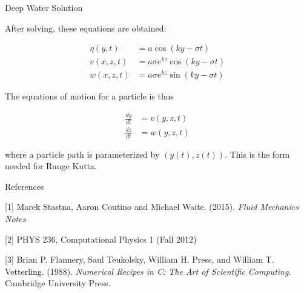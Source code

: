 \documentclass{beamer}
\begin{document}
\begin{frame}{Deep Water Solution}

After solving, these equations are obtained:

\begin{align*}
\eta (y,t) &= a \cos (ky-\sigma t) \\
v(x,z,t) &= a \sigma e^{kz} \cos (ky-\sigma t) \\
w(x,z,t) &= a \sigma e^{kz} \sin (ky-\sigma t)
\end{align*}

\vspace{0.03\textheight}

The equations of motion for a particle is thus

\begin{align*}
\frac{dy}{dt}&=v(y,z,t) \\
\frac{dz}{dt}&=w(y,z,t)
\end{align*}

\vspace{0.03\textheight}

where a particle path is parameterized by $(y(t),z(t))$.
This is the form needed for Runge Kutta.

\end{frame}


\begin{frame}{References}

[1] Marek Stastna, Aaron Coutino and Michael Waite. (2015). \textit{Fluid Mechanics Notes}

\vspace{0.03\textheight}

[2] PHYS 236, Computational Physics 1 (Fall 2012)

\vspace{0.03\textheight}

[3] Brian P. Flannery, Saul Teukolsky, William H. Press, and William T. Vetterling. (1988). \textit{Numerical Recipes in C: The Art of Scientific Computing}. Cambridge University Press.

\vspace{0.03\textheight}


\end{frame}
\end{document}
